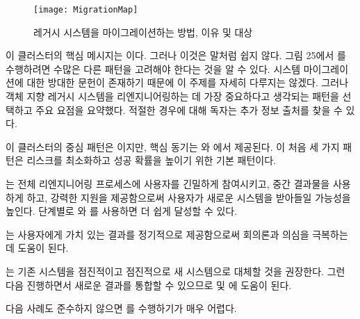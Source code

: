 \documentclass[a4paper,10pt,twoside]{book}
\begin{document}
\begin{figure}
\begin{center}
\texttt{[image: MigrationMap]}
\caption{레거시 시스템을 마이그레이션하는 방법, 이유 및 대상}
\end{center}
\end{figure}

이 클러스터의 핵심 메시지는 이다. 그러나 이것은 말처럼 쉽지 않다. 그림 25에서 를 수행하려면 수많은 다른 패턴을 고려해야 한다는 것을 알 수 있다. 시스템 마이그레이션에 대한 방대한 문헌이 존재하기 때문에 이 주제를 자세히 다루지는 않겠다. 그러나 객체 지향 레거시 시스템을 리엔지니어링하는 데 가장 중요하다고 생각되는 패턴을 선택하고 주요 요점을 요약했다. 적절한 경우에 대해 독자는 추가 정보 출처를 찾을 수 있다.

이 클러스터의 중심 패턴은 이지만, 핵심 동기는 와 에서 제공된다. 이 처음 세 가지 패턴은 리스크를 최소화하고 성공 확률을 높이기 위한 기본 패턴이다.

\begin{bulletlist}
\item {}는 전체 리엔지니어링 프로세스에 사용자를 긴밀하게 참여시키고, 중간 결과물을 사용하게 하고, 강력한 지원을 제공함으로써 사용자가 새로운 시스템을 받아들일 가능성을 높인다. 단계별로 와 를 사용하면 더 쉽게 달성할 수 있다.

\item {}는 사용자에게 가치 있는 결과를 정기적으로 제공함으로써 회의론과 의심을 극복하는 데 도움이 된다. 

\item {}는 기존 시스템을 점진적이고 점진적으로 새 시스템으로 대체할 것을 권장한다. 그런 다음 진행하면서 새로운 결과를 통합할 수 있으므로  및 에 도움이 된다.
\end{bulletlist}

다음 사례도 준수하지 않으면 를 수행하기가 매우 어렵다.
\end{document}
